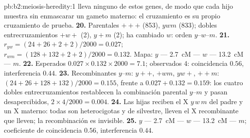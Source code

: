 \begin{solution}{pb:b2:meiosis-heredity:1}
lleva ninguno de estos genes, de modo que cada hijo muestra sin
enmascarar un gameto materno: el cruzamiento es su propio cruzamiento de
prueba.
\textbf{20.} Parentales $+++$ (853), $ywm$ (833); dobles entrecruzamientos
$+w+$ (2), $y+m$ (2); ha cambiado $w$: orden $y$--$w$--$m$.
\textbf{21.} $r_{yw} = (24 + 26 + 2 + 2)/2000 = 0.027$; $r_{wm} = (128
+ 132 + 2 + 2)/2000 = 0.132$. Mapa: $y$ --- \qty{2.7}{cM} --- $w$ ---
\qty{13.2}{cM} --- $m$.
\textbf{22.} Esperados $0.027\times 0.132\times 2000 = 7.1$; observados
4: coincidencia $0.56$, interferencia $0.44$.
\textbf{23.} Recombinantes $y$--$m$: $y++$, $+wm$, $yw+$, $++m$: $(24 +
26 + 128 + 132)/2000 = 0.155$, frente a $0.027 + 0.132 = 0.159$: los
cuatro dobles entrecruzamientos restablecen la combinación parental
$y$--$m$ y pasan desapercibidos, $2\times 4/2000 = 0.004$.
\textbf{24.} Las hijas reciben el X $y\,w\,m$ del padre y un X materno:
todas son heterocigotas y de  silvestre, lleven el X recombinante
que lleven; la recombinación es invisible.
\textbf{25.} $y$ --- \qty{2.7}{cM} --- $w$ --- \qty{13.2}{cM} --- $m$;
coeficiente de coincidencia $0.56$, interferencia $0.44$.
\end{solution}
